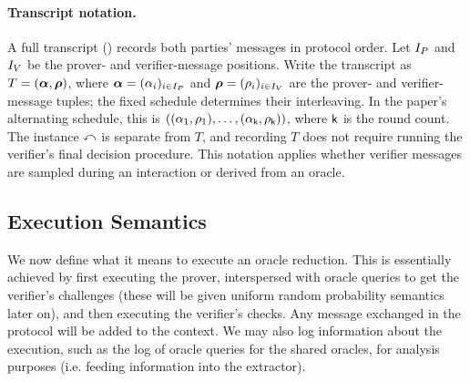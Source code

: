 \paragraph{Transcript notation.}
A full transcript () records both parties'
messages in protocol order. Let \(I_P\) and \(I_V\) be the prover- and verifier-message
positions. Write the transcript as \(T=(\boldsymbol{\alpha},\boldsymbol{\rho})\), where
\(\boldsymbol{\alpha}=(\alpha_i)_{i\in I_P}\) and \(\boldsymbol{\rho}=(\rho_i)_{i\in I_V}\) are the prover-
and verifier-message tuples; the fixed schedule determines their interleaving.
In the paper's alternating schedule, this is
\(((\alpha_1,\rho_1),\ldots,(\alpha_{\mathsf{k}},\rho_{\mathsf{k}}))\), where \(\mathsf{k}\) is the round count.
The instance \(\mathbb{x}\) is separate from \(T\), and recording \(T\) does not require
running the verifier's final decision procedure. This notation applies whether
verifier messages are sampled during an interaction or derived from an oracle.

\subsection{Execution Semantics}\label{sec:execution_semantics}

We now define what it means to execute an oracle reduction. This is essentially achieved by first
executing the prover, interspersed with oracle queries to get the verifier's challenges (these will
be given uniform random probability semantics later on), and then executing the verifier's checks.
Any message exchanged in the protocol will be added to the context. We may also log information
about the execution, such as the log of oracle queries for the shared oracles, for analysis purposes
(i.e. feeding information into the extractor).


